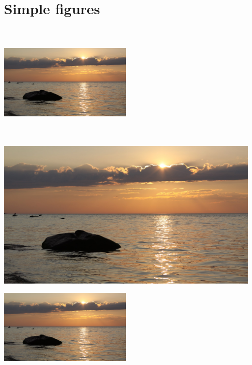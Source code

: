 \documentclass[12pt]{report}
\begin{document}
\listoffigures %
\section{Simple figures}

\includegraphics[height = 6cm, width = 0.5\textwidth]{demo} %

\vspace{2em}

\includegraphics[scale = 0.1, angle = 45]{demo} 

\includegraphics[width=0.5\textwidth, right]{demo} %
\end{document}
